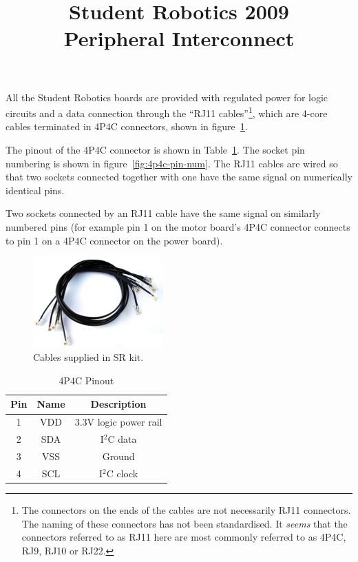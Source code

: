 \documentclass[a4paper,twocolumn]{article}
\title{Student Robotics 2009\\ Peripheral Interconnect}
\newcommand{\itwoc}{I$^2$C }
\begin{document}
\maketitle

All the Student Robotics boards are provided with regulated power for logic circuits and a data connection through the ``RJ11 cables''\footnote{The connectors on the ends of the cables are not necessarily RJ11 connectors.  The naming of these connectors has not been standardised.  It \emph{seems} that the connectors referred to as RJ11 here are most commonly referred to as 4P4C, RJ9, RJ10 or RJ22.}, which are 4-core cables terminated in 4P4C connectors, shown in figure~\ref{fig:coil}.

The pinout of the 4P4C connector is shown in Table~\ref{tab:4p4c-pinout}.  The socket pin numbering is shown in figure~\ref{fig:4p4c-pin-num}.  The RJ11 cables are wired so that two sockets connected together with one have the same signal on numerically identical pins.

Two sockets connected by an RJ11 cable have the same signal on similarly numbered pins (for example pin 1 on the motor board's 4P4C connector connects to pin 1 on a 4P4C connector on the power board).

\begin{figure}
  \begin{center}
    \includegraphics[width=5cm]{./images/coil.jpg}
  \end{center}
  \caption{\label{fig:coil}Cables supplied in SR kit.}
\end{figure}

\begin{table}
  \caption{\label{tab:4p4c-pinout}4P4C Pinout}

  \begin{center}
    \begin{tabular}{|c|c|c|}
      \hline
      \textbf{Pin} & \textbf{Name} & \textbf{Description} \\
      \hline
      1 & VDD & 3.3V logic power rail\\
      2 & SDA & \itwoc data \\
      3 & VSS & Ground \\
      4 & SCL & \itwoc clock\\
      \hline
    \end{tabular}
  \end{center}
\end{table}
\end{document}
